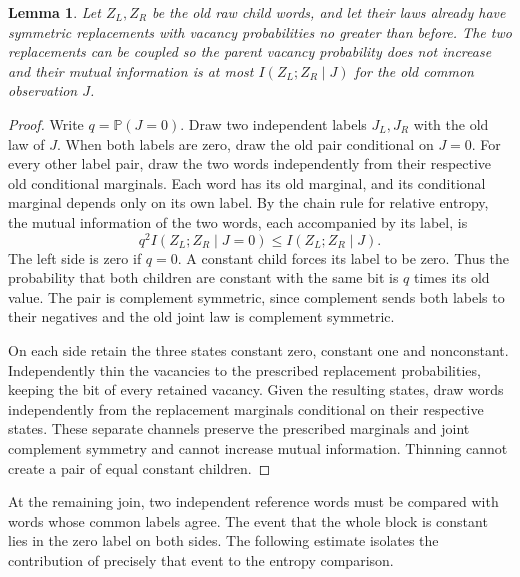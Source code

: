 \documentclass[11pt]{article}
\newtheorem{lemma}[theorem]{Lemma}
\numberwithin{equation}{section}
\newcommand{\PP}{\mathbb P}
\begin{document}
\begin{lemma}\label{l:join}
Let $Z_L,Z_R$ be the old raw child words, and let their laws
already have symmetric replacements with vacancy probabilities
no greater than before. The two replacements can be coupled so
the parent vacancy probability does not increase and their mutual
information is at most $I(Z_L;Z_R\mid J)$ for the old common
observation $J$.
\end{lemma}
\begin{proof}
Write $q=\PP(J=0)$. Draw two independent labels $J_L,J_R$ with
the old law of $J$. When both labels are zero, draw the old pair
conditional on $J=0$. For every other label pair, draw the two
words independently from their respective old conditional marginals.
Each word has its old marginal, and its conditional marginal depends
only on its own label. By the chain rule for relative entropy, the
mutual information of the two words, each accompanied by its label, is
\[
 q^2 I(Z_L;Z_R\mid J=0)\le I(Z_L;Z_R\mid J).
\]
The left side is zero if $q=0$. A constant child forces its label
to be zero. Thus the probability that both children are constant
with the same bit is $q$ times its old value. The pair is
complement symmetric, since complement sends both labels to their
negatives and the old joint law is complement symmetric.

On each side retain the three states constant zero, constant one
and nonconstant. Independently thin the vacancies to the prescribed
replacement probabilities, keeping the bit of every retained vacancy.
Given the resulting states, draw words independently from the
replacement marginals conditional on their respective states.
These separate channels preserve the prescribed marginals and joint
complement symmetry and cannot increase mutual information. Thinning
cannot create a pair of equal constant children.
\end{proof}

At the remaining join, two independent reference words must be
compared with words whose common labels agree. The event that the
whole block is constant lies in the zero label on both sides.
The following estimate isolates the contribution of precisely that
event to the entropy comparison.
\end{document}
